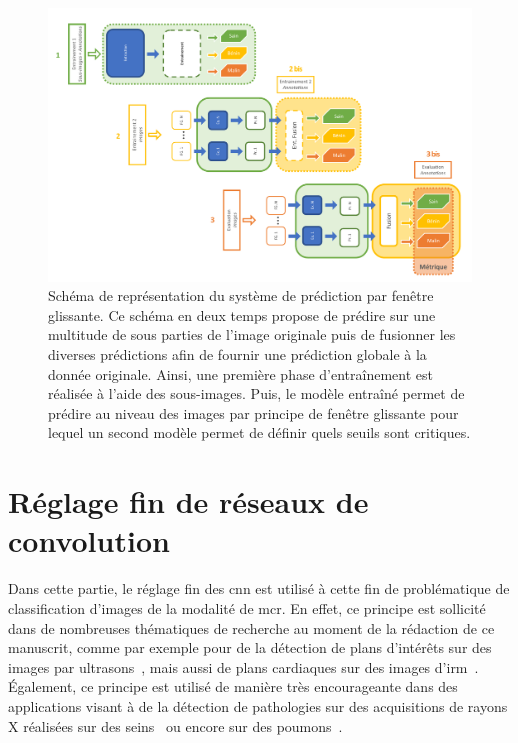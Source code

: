 \begin{landscape}
\begin{figure}[H]
    \centering
    \includegraphics[width=0.8\linewidth]{contents/chapter_6/resources/scheme_image_improvement_sliding_features.pdf}
    \caption{Schéma de représentation du système de prédiction par fenêtre glissante. Ce schéma en deux temps propose de prédire sur une multitude de sous parties de l'image originale puis de fusionner les diverses prédictions afin de fournir une prédiction globale à la donnée originale. Ainsi, une première phase d'entraînement est réalisée à l'aide des sous-images. Puis, le modèle entraîné permet de prédire au niveau des images par principe de fenêtre glissante pour lequel un second modèle permet de définir quels seuils sont critiques.}
    \label{fig:scheme_image_improvement_sliding_features}
\end{figure}\par
\end{landscape}

\section{Réglage fin de réseaux de convolution}
Dans cette partie, le réglage fin des \gls{cnn} est utilisé à cette fin de problématique de classification d'images de la modalité de \gls{mcr}. En effet, ce principe est sollicité dans de nombreuses thématiques de recherche au moment de la rédaction de ce manuscrit, comme par exemple pour de la détection de plans d'intérêts sur des images par ultrasons~\cite{Chen2015}, mais aussi de plans cardiaques sur des images d'\gls{irm}~\cite{Margeta2017}. Également, ce principe est utilisé de manière très encourageante dans des applications visant à de la détection de pathologies sur des acquisitions de rayons X réalisées sur des seins~\cite{Lotter2017} ou encore sur des poumons~\cite{Gao2018}.\par

